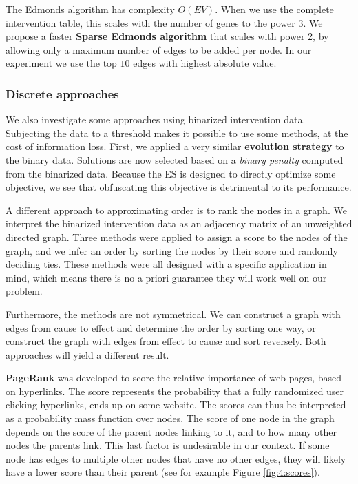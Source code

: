 The Edmonds algorithm has complexity $O(EV)$. When we use the complete intervention table, this scales with the number of genes to the power 3. We propose a faster \textbf{Sparse Edmonds algorithm} that scales with power 2, by allowing only a maximum number of edges to be added per node. In our experiment we use the top $10$ edges with highest absolute value.

\subsubsection{Discrete approaches}

We also investigate some approaches using binarized intervention data. Subjecting the data to a threshold makes it possible to use some methods, at the cost of information loss. First, we applied a very similar \textbf{evolution strategy} to the binary data. Solutions are now selected based on a \textit{binary penalty} computed from the binarized data. Because the ES is designed to directly optimize some objective, we see that obfuscating this objective is detrimental to its performance.

A different approach to approximating order is to rank the nodes in a graph. We interpret the binarized intervention data as an adjacency matrix of an unweighted directed graph. Three methods were applied to assign a score to the nodes of the graph, and we infer an order by sorting the nodes by their score and randomly deciding ties. These methods were all designed with a specific application in mind, which means there is no a priori guarantee they will work well on our problem.

Furthermore, the methods are not symmetrical. We can construct a graph with edges from cause to effect and determine the order by sorting one way, or construct the graph with edges from effect to cause and sort reversely. Both approaches will yield a different result. 

\textbf{PageRank} \citep{page1999pagerank} was developed to score the relative importance of web pages, based on hyperlinks. The score represents the probability that a fully randomized user clicking hyperlinks, ends up on some website. The scores can thus be interpreted as a probability mass function over nodes. The score of one node in the graph depends on the score of the parent nodes linking to it, and to how many other nodes the parents link. This last factor is undesirable in our context. If some node has edges to multiple other nodes that have no other edges, they will likely have a lower score than their parent (see for example Figure \ref{fig:4:scores}). 

